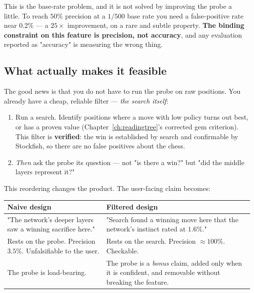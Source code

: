 \begin{keyidea}
This is the base-rate problem, and it is not solved by improving the probe a little. To reach
$50\%$ precision at a $1/500$ base rate you need a false-positive rate near $0.2\%$ --- a
$25\times$ improvement, on a rare and subtle property. \textbf{The binding constraint on this
feature is precision, not accuracy}, and any evaluation reported as "accuracy" is measuring
the wrong thing.
\end{keyidea}

\subsection{What actually makes it feasible}

The good news is that you do not have to run the probe on raw positions. You already have a
cheap, reliable filter --- \emph{the search itself}:

\begin{enumerate}
\item Run a search. Identify positions where a move with low policy turns out best, or has a
  proven value (Chapter~\ref{ch:readingtree}'s corrected gem criterion). This filter is
  \textbf{verified}: the win is established by search and confirmable by Stockfish, so there
  are no false positives about the chess.
\item \emph{Then} ask the probe its question --- not "is there a win?" but "did the middle
  layers represent it?"
\end{enumerate}

This reordering changes the product. The user-facing claim becomes:

\begin{center}
\begin{tabular}{@{}p{6.3cm}p{6.9cm}@{}}
\toprule
\textbf{Naive design} & \textbf{Filtered design} \\
\midrule
"The network's deeper layers saw a winning sacrifice here." & "Search found a winning move
here that the network's instinct rated at $1.6\%$." \\
\addlinespace
Rests on the probe. Precision $3.5\%$. Unfalsifiable to the user. & Rests on the search.
Precision $\approx 100\%$. Checkable. \\
\addlinespace
The probe is load-bearing. & The probe is a \emph{bonus} claim, added only when it is
confident, and removable without breaking the feature. \\
\bottomrule
\end{tabular}
\end{center}

